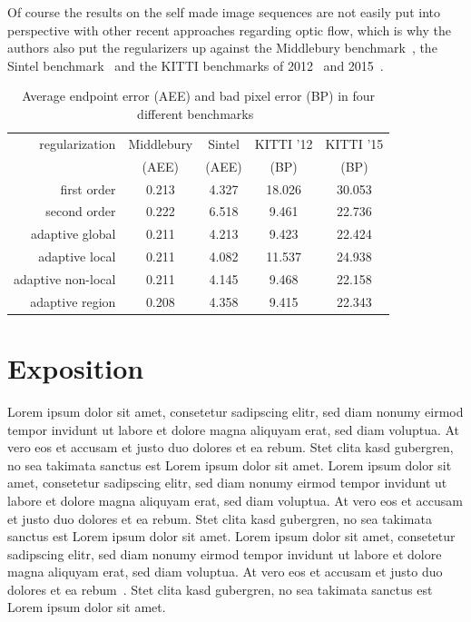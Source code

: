 \documentclass[journal]{vgtc}
\begin{document}
Of course the results on the self made image sequences are not easily put into perspective with other recent approaches regarding optic flow, which is why the authors also put the regularizers up against the Middlebury benchmark~\cite{middlebury}, the Sintel benchmark~\cite{sintel} and the KITTI benchmarks of 2012~\cite{kitti12} and 2015~\cite{kitti15}.


\begin{table}[htb]
\caption{\label{tbl:benchmarks} Average endpoint error (AEE) and bad pixel error (BP) in four different benchmarks~\cite{daspaper}}
\scriptsize
\begin{center}
\begin{tabular}{r|cccc}
regularization & Middlebury & Sintel & KITTI '12 & KITTI '15
\\
& (AEE) & (AEE) & (BP) & (BP)
\\\hline
first order        & 0.213 & 4.327 & 18.026 & 30.053
\\
second order       & 0.222 & 6.518 & 9.461 & 22.736
\\\hline
adaptive global    & 0.211 & 4.213 & 9.423 & 22.424
\\
adaptive local     & 0.211 & 4.082 & 11.537 & 24.938
\\
adaptive non-local & 0.211 & 4.145 & 9.468 & 22.158
\\
adaptive region    & 0.208 & 4.358 & 9.415 & 22.343 
\end{tabular}
\end{center}
\end{table}



\section{Exposition}

Lorem ipsum dolor sit amet, consetetur sadipscing elitr, sed diam
nonumy eirmod tempor invidunt ut labore et dolore magna aliquyam erat,
sed diam voluptua. At vero eos et accusam et justo duo dolores et ea
rebum. Stet clita kasd gubergren, no sea takimata sanctus est Lorem
ipsum dolor sit amet. Lorem ipsum dolor sit amet, consetetur
sadipscing elitr, sed diam nonumy eirmod tempor invidunt ut labore et
dolore magna aliquyam erat, sed diam voluptua. At vero eos et accusam
et justo duo dolores et ea rebum. Stet clita kasd gubergren, no sea
takimata sanctus est Lorem ipsum dolor sit amet. Lorem ipsum dolor sit
amet, consetetur sadipscing elitr, sed diam nonumy eirmod tempor
invidunt ut labore et dolore magna aliquyam erat, sed diam
voluptua. At vero eos et accusam et justo duo dolores et ea
rebum~\cite{ware:2004:IVP}. Stet clita kasd gubergren, no sea takimata
sanctus est Lorem ipsum dolor sit amet.
\end{document}
